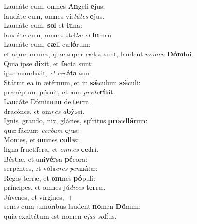 \evenverse Laudáte eum, omnes \textbf{An}geli \textbf{e}jus:~\*\\
\evenverse laudáte eum, omnes vir\textit{tú}\textit{tes} \textbf{e}jus.\\
\oddverse Laudáte eum, \textbf{sol} et \textbf{lu}na:~\*\\
\oddverse laudáte eum, omnes stel\textit{læ} \textit{et} \textbf{lu}men.\\
\evenverse Laudáte eum, \textbf{cæ}li cæ\textbf{ló}rum:~\*\\
\evenverse et aquæ omnes, quæ super cælos sunt, laudent \textit{no}\textit{men} \textbf{Dó}\textbf{mi}ni.\\
\oddverse Quia ipse \textbf{di}xit, et \textbf{fa}cta sunt:~\*\\
\oddverse ipse mandávit, \textit{et} \textit{cre}\textbf{á}\textbf{ta} sunt.\\
\evenverse Státuit ea in ætérnum, et in \textbf{sǽ}culum \textbf{sǽ}culi:~\*\\
\evenverse præcéptum pósuit, et non \textit{præ}\textit{te}\textbf{rí}bit.\\
\oddverse Laudáte Dómi\textbf{num} de \textbf{ter}ra,~\*\\
\oddverse dracónes, et om\textit{nes} \textit{a}\textbf{býs}si.\\
\evenverse Ignis, grando, nix, glácies, spíritus \textbf{pro}cel\textbf{lá}rum:~\*\\
\evenverse quæ fáciunt \textit{ver}\textit{bum} \textbf{e}jus:\\
\oddverse Montes, et \textbf{om}nes \textbf{col}les:~\*\\
\oddverse ligna fructífera, et \textit{om}\textit{nes} \textbf{ce}dri.\\
\evenverse Béstiæ, et uni\textbf{vér}sa \textbf{pé}cora:~\*\\
\evenverse serpéntes, et vólu\textit{cres} \textit{pen}\textbf{ná}tæ:\\
\oddverse Reges terræ, et \textbf{om}nes \textbf{pó}puli:~\*\\
\oddverse príncipes, et omnes jú\textit{di}\textit{ces} \textbf{ter}ræ.\\
\evenverse Júvenes, et vírgines,~+\\
\evenverse  senes cum junióribus laudent \textbf{no}men \textbf{Dó}mini:~\*\\
\evenverse quia exaltátum est nomen e\textit{jus} \textit{so}\textbf{lí}us.\\
